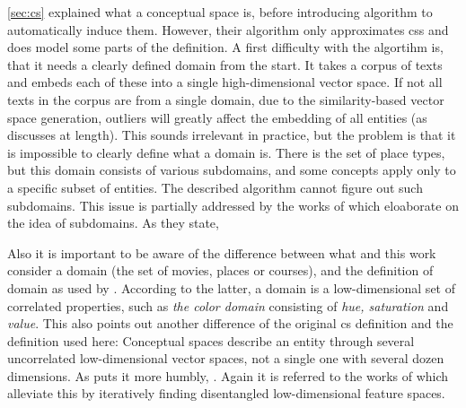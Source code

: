 \autoref{sec:cs} explained what a conceptual space is, before introducing  algorithm to automatically induce them. However, their algorithm only approximates \glspl{cs} and does model some parts of the definition. A first difficulty with the algortihm is, that it needs a clearly defined domain from the start. It takes a corpus of texts and embeds each of these into a single high-dimensional vector space. If not all texts in the corpus are from a single domain, due to the similarity-based vector space generation, outliers will greatly affect the embedding of all entities (as \cite{Ager2018} discusses at length). This sounds irrelevant in practice, but the problem is that it is impossible to clearly define what a domain is. There is the set of place types, but this domain consists of various subdomains, and some concepts apply only to a specific subset of entities. The described algorithm cannot figure out such subdomains. This issue is partially addressed by the works of \textcite{Alshaikh2019, Alshaikh2020, Alshaikh2021} which eloaborate on the idea of subdomains. As they state, \textit{} \cite{Alshaikh2020}  

Also it is important to be aware of the difference between what \mainalgos and this work consider a domain (the set of movies, places or courses), and the definition of domain as used by \textcite{Gardenfors2000a}. According to the latter, a domain is a low-dimensional set of correlated properties, such as \textit{the color domain} consisting of \textit{hue, saturation} and \textit{value}. This also points out another difference of the original \gls{cs} definition and the definition used here: Conceptual spaces describe an entity through several uncorrelated low-dimensional vector spaces, not a single one with several dozen dimensions. As \cite{Ager2018} puts it more humbly, \textit{}. Again it is referred to the works of \textcite{Alshaikh2019, Alshaikh2020, Alshaikh2021} which alleviate this by iteratively finding disentangled low-dimensional feature spaces.

